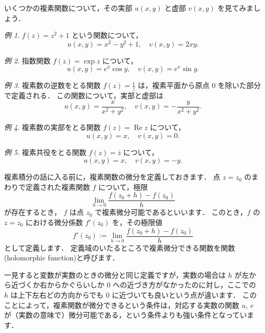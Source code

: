 \documentclass{ltjsarticle}
\newcommand{\ImagI}{i}%
\DeclareMathOperator{\RealPart}{Re}
\theoremstyle{definition}
\theoremstyle{remark}
\newtheorem{example}{例}
\begin{document}
いくつかの複素関数について，その実部 $u(x,y)$ と虚部 $v(x,y)$ を見てみましょう．

\begin{example}
  $f(z)=z^2+1$ という関数について，
  \[u(x,y)=x^2-y^2+1, \quad v(x,y)=2xy.\]
\end{example}

\begin{example}
  指数関数 $f(z)=\exp z$ について，%
  \[u(x,y)=e^x\cos y, \quad v(x,y)=e^x\sin y.\]
\end{example}

\begin{example} \label{example:1/z}
  複素数の逆数をとる関数 $f(z)=\frac{1}{z}$ は，複素平面から原点 $0$ を除いた部分で定義される．
  この関数について，実部と虚部は
  \[u(x,y)=\frac{x}{x^2+y^2}, \quad v(x,y)=-\frac{y}{x^2+y^2}.\]
\end{example}

\begin{example}
  複素数の実部をとる関数 $f(z)=\RealPart z$ について，
  \[u(x,y)=x, \quad v(x,y)=0.\]
\end{example}

\begin{example}
  複素共役をとる関数 $f(z)=\bar{z}$ について，
  \[u(x,y)=x, \quad v(x,y)=-y.\]
\end{example}


\newcommand{\pdiff}[2]{\frac{\partial #1}{\partial #2}}

複素積分の話に入る前に，複素関数の微分を定義しておきます．
点 $z=z_0$ のまわりで定義された複素関数 $f$ について，極限
\[\lim_{h\to 0} \frac{f(z_0+h)-f(z_0)}{h}\]
が存在するとき， $f$ は点 $z_0$ で複素微分可能であるといいます．
このとき，$f$ の $z=z_0$ における微分係数 $f'(z_0)$ を，その極限値
\[f'(z_0):=\lim_{h\to 0} \frac{f(z_0+h)-f(z_0)}{h}\]
として定義します．
定義域のいたるところで複素微分できる関数を関数(holomorphic function)と呼びます．

一見すると変数が実数のときの微分と同じ定義ですが，実数の場合は $h$ が左から近づくか右からかぐらいしか $0$ への近づき方がなかったのに対し，ここでの $h$ は上下左右どの方向からでも $0$ に近づいても良いという点が違います．
このことによって，複素関数が微分できるという条件は，対応する実数の関数 $u$, $v$ が（実数の意味で）微分可能である，という条件よりも強い条件となっています．
\end{document}
